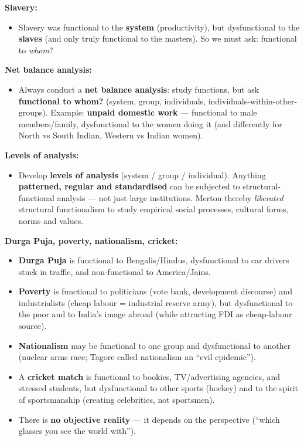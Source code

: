\begin{ExampleBox}
\textbf{Slavery:}
\begin{itemize}
\item Slavery was functional to the \textbf{system} (productivity), but dysfunctional to the \textbf{slaves} (and only truly functional to the masters). So we must ask: functional to \textit{whom}?
\end{itemize}
\end{ExampleBox}

\begin{KeyConcept}
\textbf{Net balance analysis:}
\begin{itemize}
\item Always conduct a \textbf{net balance analysis}: study functions, but ask \textbf{functional to whom?} (system, group, individuals, individuals-within-other-groups). Example: \textbf{unpaid domestic work} --- functional to male members/family, dysfunctional to the women doing it (and differently for North vs South Indian, Western vs Indian women).
\end{itemize}
\end{KeyConcept}

\begin{KeyConcept}
\textbf{Levels of analysis:}
\begin{itemize}
\item Develop \textbf{levels of analysis} (system / group / individual). Anything \textbf{patterned, regular and standardised} can be subjected to structural-functional analysis --- not just large institutions. Merton thereby \textit{liberated} structural functionalism to study empirical social processes, cultural forms, norms and values.
\end{itemize}
\end{KeyConcept}

\begin{ExampleBox}
\textbf{Durga Puja, poverty, nationalism, cricket:}
\begin{itemize}
\item \textbf{Durga Puja} is functional to Bengalis/Hindus, dysfunctional to car drivers stuck in traffic, and non-functional to America/Jains. \item \textbf{Poverty} is functional to politicians (vote bank, development discourse) and industrialists (cheap labour = industrial reserve army), but dysfunctional to the poor and to India's image abroad (while attracting FDI as cheap-labour source). \item \textbf{Nationalism} may be functional to one group and dysfunctional to another (nuclear arms race; Tagore called nationalism an ``evil epidemic''). \item A \textbf{cricket match} is functional to bookies, TV/advertising agencies, and stressed students, but dysfunctional to other sports (hockey) and to the spirit of sportsmanship (creating celebrities, not sportsmen).
\item There is \textbf{no objective reality} --- it depends on the perspective (``which glasses you see the world with'').
\end{itemize}
\end{ExampleBox}

